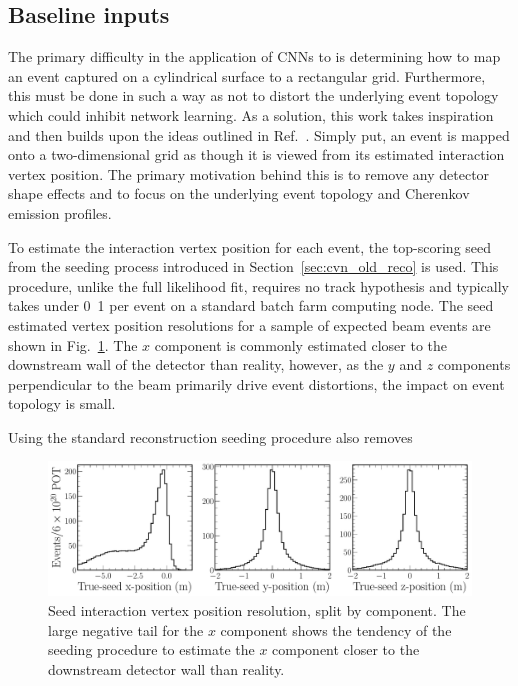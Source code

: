 \subsection{Baseline inputs} %
\label{sec:cvn_baseline_inputs} %

The primary difficulty in the application of CNNs to \chips is determining how to map an event
captured on a cylindrical surface to a rectangular grid. Furthermore, this must be done in such a
way as not to distort the underlying event topology which could inhibit network learning. As a
solution, this work takes inspiration and then builds upon the ideas outlined in
Ref.~\cite{theodore2016}. Simply put, an event is mapped onto a two-dimensional grid as though it
is viewed from its estimated interaction vertex position. The primary motivation behind this is to
remove any detector shape effects and to focus on the underlying event topology and Cherenkov
emission profiles.

To estimate the interaction vertex position for each event, the top-scoring seed from the seeding
process introduced in Section~\ref{sec:cvn_old_reco} is used. This procedure, unlike the full
likelihood fit, requires no track hypothesis and typically takes under
\unit{0.1}{} per event on a standard batch farm computing node. The seed estimated
vertex position resolutions for a sample of expected beam events are shown in
Fig.~\ref{fig:explore_true_reco_vtx}. The $x$ component is commonly estimated closer to the
downstream wall of the detector than reality, however, as the $y$ and $z$ components perpendicular
to the beam primarily drive event distortions, the impact on event topology is small.

Using the standard reconstruction seeding procedure also removes

\begin{figure} %
    \includegraphics[width=\textwidth]{diagrams/6-cvn/chipsnet/explore_true_reco_vtx.pdf}
    \caption[Seed interaction vertex resolutions.]
    {Seed interaction vertex position resolution, split by component. The large negative tail for
        the $x$ component shows the tendency of the seeding procedure to estimate the $x$
        component closer to the downstream detector wall than reality.}
    \label{fig:explore_true_reco_vtx}
\end{figure}

